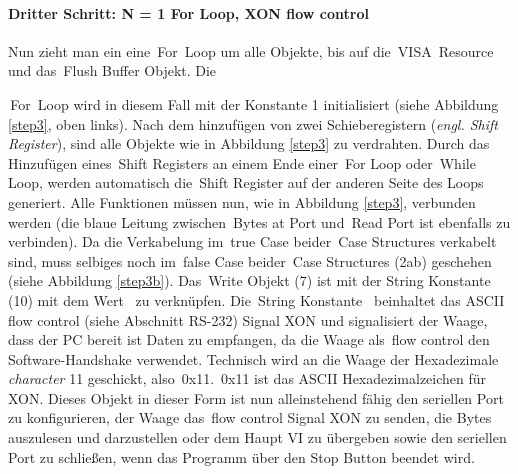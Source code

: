 \paragraph{Dritter Schritt: N = 1 For Loop, XON flow control}

Nun zieht man ein eine \,{\Menlo For} \,{\Menlo Loop} um alle Objekte, bis auf die \,{\Menlo VISA} \,{\Menlo Resource} und das \,{\Menlo Flush Buffer} Objekt. Die {\,{\Menlo For} \,{\Menlo Loop} wird in diesem Fall mit der Konstante 1 initialisiert (siehe Abbildung \ref{step3}, oben links). Nach dem hinzufügen von zwei Schieberegistern (\textit{engl. Shift Register}), sind alle Objekte wie in Abbildung \ref{step3} zu verdrahten. Durch das Hinzufügen eines \,{\Menlo Shift Registers} an einem Ende einer \,{\Menlo For Loop} oder \,{\Menlo While Loop}, werden automatisch die \,{\Menlo Shift Register} auf der anderen Seite des Loops generiert. Alle Funktionen müssen nun, wie in Abbildung \ref{step3}, verbunden werden (die blaue Leitung zwischen \,{\Menlo Bytes at Port} und \,{\Menlo Read Port} ist ebenfalls zu verbinden). Da die \glqq Verkabelung\grqq{} im \,{\Menlo true} Case beider \,{\Menlo Case Structures} verkabelt sind, muss selbiges noch im \,{\Menlo false} Case beider \,{\Menlo Case Structures} (2ab) geschehen (siehe Abbildung \ref{step3b}). Das \,{\Menlo Write} Objekt (7) ist mit der String Konstante (10) mit dem Wert \,{} zu verknüpfen. Die \,{\Menlo String Konstante} \,{} beinhaltet das ASCII flow control (siehe Abschnitt RS-232) Signal XON und signalisiert der Waage, dass der PC bereit ist Daten zu empfangen, da die Waage als \,{\Menlo flow control} den Software-Handshake verwendet. Technisch wird an die Waage der Hexadezimale \textit{character} 11 geschickt, also \,{\Menlo 0x11}. \,{\Menlo 0x11} ist das ASCII Hexadezimalzeichen für XON.  Dieses Objekt in dieser Form ist nun alleinstehend fähig den seriellen Port zu konfigurieren, der Waage das \,{\Menlo flow control} Signal XON zu senden, die Bytes auszulesen und darzustellen oder dem Haupt VI zu übergeben sowie den seriellen Port zu schließen, wenn das Programm über den Stop Button beendet wird.

}
